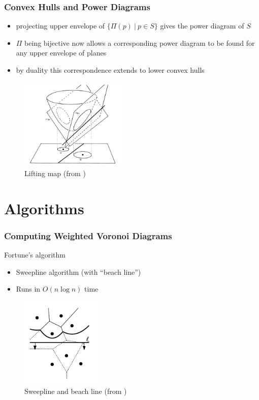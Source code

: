 \documentclass{beamer}
\begin{document}
\begin{frame}
  \frametitle{Convex Hulls and Power Diagrams}

  \begin{itemize}
    \item projecting upper envelope of $\{ \Pi(p) \ | \ p \in S \}$ gives the power diagram of $S$
    \item $\Pi$ being bijective now allows a corresponding power diagram to be found for any upper envelope of planes
    \item by duality this correspondence extends to lower convex hulls \cite{aurenhammer_power}
  \end{itemize}

  \begin{figure}
    \includegraphics[width=2in]{lifting(aur_surv).png}
    \caption{Lifting map (from \cite{aurenhammer_survey})}
  \end{figure}

\end{frame}

\section{Algorithms}

\begin{frame}
  \frametitle{Computing Weighted Voronoi Diagrams}

  Fortune's algorithm \cite{fortune_sweepline} \cite{rosenberger_additive}
  \begin{itemize}
    \item Sweepline algorithm (with ``beach line'')
    \item Runs in $O(n \log n)$ time
  \end{itemize}

  \begin{figure}
    \includegraphics[width=1.5in]{beach(comp_geom).png}
    \caption{Sweepline and beach line (from \cite{comp_geom})}
  \end{figure}

\end{frame}
\end{document}
